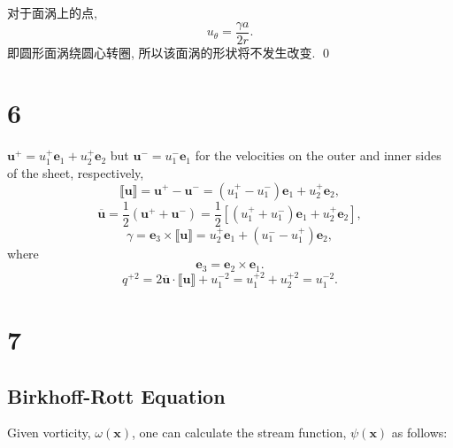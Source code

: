\documentclass[12pt]{article}
\newcommand{\bs}  [1]{\boldsymbol{#1}}
\begin{document}
对于面涡上的点, 
\begin{equation}
	u_\theta = \frac{\gamma a}{2r}.
\end{equation}
即圆形面涡绕圆心转圈, 所以该面涡的形状将不发生改变. \qed

\section{6}

$\bm{u}^+ = u^+_1 \bm{e}_1 + u^+_2 \bm{e}_2$ but $\bm{u}^− = u^−_1 \bm{e}_1$ for the velocities on the outer and inner sides of the sheet, respectively,
\begin{equation}
	\llbracket \boldsymbol{u} \rrbracket = \bm{u}^+ - \bm{u}^- = \left(u_{1}^{+}-u_{1}^{-}\right) \boldsymbol{e}_{1}+u_{2}^{+} \boldsymbol{e}_{2},
\end{equation}
\begin{equation}
	\overline{\boldsymbol{u}} = \frac{1}{2} \left(\bm{u}^+ + \bm{u}^-\right) = \frac{1}{2}\left[\left(u_{1}^{+}+u_{1}^{-}\right) \boldsymbol{e}_{1}+u_{2}^{+} \boldsymbol{e}_{2}\right],
\end{equation}
\begin{equation}
	\gamma = \bm{e}_3 \times \llbracket \boldsymbol{u} \rrbracket = u_{2}^{+} \boldsymbol{e}_{1}+\left(u_{1}^{-}-u_{1}^{+}\right) \boldsymbol{e}_{2},
\end{equation}
where
\begin{equation}
	\bm{e}_3 = \bm{e}_2 \times \bm{e}_1.
\end{equation}
\begin{equation}
	q^{+2} = 2 \overline{\boldsymbol{u}} \cdot \llbracket \boldsymbol{u} \rrbracket + u_{1}^{-2} = u_{1}^{+2}+u_{2}^{+2}=u_{1}^{-2}.
\end{equation}

\section{7}

\subsection{Birkhoff-Rott Equation}
Given vorticity, $\omega(\bs x)$, one can calculate the stream function, $\psi(\bs x)$ as follows:
\end{document}
